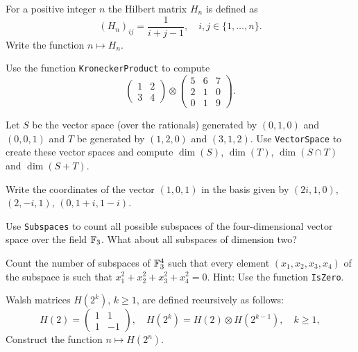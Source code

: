 \begin{prob}
  For a positive integer $n$ the Hilbert matrix $H_n$ is defined as 
  \[
    (H_n)_{ij}=\frac{1}{i+j-1},\quad i,j\in\{1,\dots,n\}.
  \]
  Write the function $n\mapsto H_n$.
\end{prob}

\begin{prob}
  Use the function \lstinline{KroneckerProduct} to 
  compute
  \[
    \begin{pmatrix}
      1 & 2\\
      3 & 4
    \end{pmatrix}
    \otimes
    \begin{pmatrix}
      5 & 6 & 7\\
      2 & 1 & 0\\
      0 & 1 & 9
    \end{pmatrix}.
  \]
\end{prob}


\begin{prob}
	\label{prob:vsQ}
	Let $S$ be the vector space (over the rationals) generated by $(0,1,0)$ and
	$(0,0,1)$ and $T$ be generated by $(1,2,0)$ and $(3,1,2)$. Use
	\lstinline{VectorSpace} to create these vector spaces and compute $\dim(S)$,
	$\dim(T)$, $\dim(S\cap T)$ and $\dim(S+T)$.
\end{prob}

\begin{prob}
	\label{prob:withE(4)}
	Write the coordinates of the vector $(1,0,1)$ in the basis given by
	$(2i,1,0)$, $(2,-i,1)$, $(0,1+i,1-i)$. 
\end{prob}

\begin{prob}
    Use \lstinline{Subspaces} to count all possible subspaces
    of the four-dimensional vector space
    over the field $\mathbb{F}_3$. What about all subspaces of 
    dimension two?
\end{prob}

\begin{prob}
    Count the number of subspaces of $\mathbb{F}_3^4$ 
    such that every element $(x_1,x_2,x_3,x_4)$ 
    of the subspace is such that $x_1^2+x_2^2+x_3^2+x_4^2=0$. Hint: Use the function \lstinline{IsZero}. 
\end{prob}

\begin{prob}
  Walsh matrices $H(2^k)$, $k\geq1$, are defined recursively as follows:
  \[
    H(2)=\begin{pmatrix}
      1 & 1\\
      1 & -1
    \end{pmatrix}
    ,\quad
    H(2^k)=H(2)\otimes H(2^{k-1}),\quad k\geq1,
  \]
  Construct the function $n\mapsto
  H(2^n)$. 
\end{prob}

